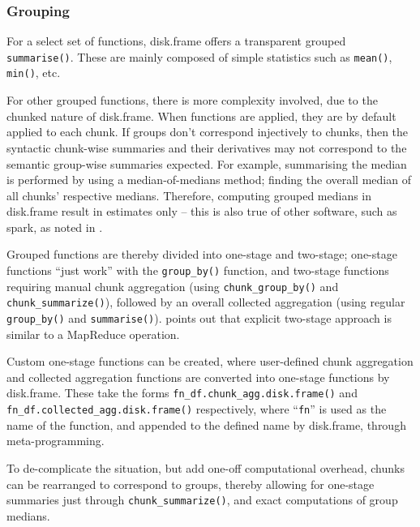 \hypertarget{sec:spec-cons-group-by}{%
    \subsubsection{Grouping}\label{sec:spec-cons-group-by}}

For a select set of functions, disk.frame offers a transparent grouped
\texttt{summarise()}. These are mainly composed
of simple statistics such as \texttt{mean()},
\texttt{min()}, etc.

For other grouped functions, there is more complexity involved, due to
the chunked nature of disk.frame. When functions are applied, they are
by default applied to each chunk. If groups don't correspond injectively
to chunks, then the syntactic chunk-wise summaries and their derivatives
may not correspond to the semantic group-wise summaries expected. For
example, summarising the median is performed by using a
median-of-medians method; finding the overall median of all chunks'
respective medians. Therefore, computing grouped medians in disk.frame
result in estimates only -- this is also true of other software, such
as spark, as noted in \cite{zj19:_group_by}.

Grouped functions are thereby divided into one-stage and two-stage;
one-stage functions ``just work'' with the
\texttt{group_by()} function, and two-stage
functions requiring manual chunk aggregation (using
\texttt{chunk_group_by()} and \texttt{chunk_summarize()}), followed by an
overall collected aggregation (using regular
\texttt{group_by()} and
\texttt{summarise()}). \cite{zj19:_group_by}
points out that explicit two-stage approach is similar to a MapReduce
operation.

Custom one-stage functions can be created, where user-defined chunk
aggregation and collected aggregation functions are converted into
one-stage functions by
disk.frame\cite{zj19:_custom_one_stage_group_by_funct}. These take
the forms
\texttt{fn_df.chunk_agg.disk.frame()} and
\texttt{fn_df.collected_agg.disk.frame()}
respectively, where ``\texttt{fn}'' is used as the name of the function,
and appended to the defined name by disk.frame, through
meta-programming.

To de-complicate the situation, but add one-off computational overhead,
chunks can be rearranged to correspond to groups, thereby allowing for
one-stage summaries just through
\texttt{chunk_summarize()}, and exact
computations of group medians.

